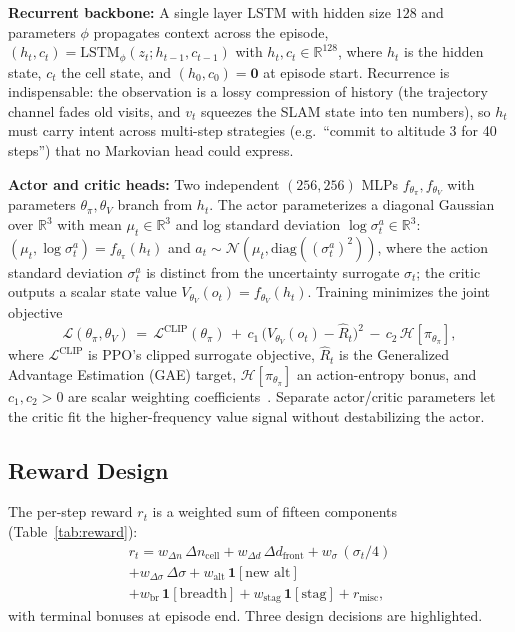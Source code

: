 \documentclass[runningheads]{llncs}
\newcommand{\ind}{\mathbf{1}}  %
\begin{document}
\textbf{Recurrent backbone:} A single layer LSTM with hidden size $128$ and parameters $\phi$ propagates context across the episode, $(h_t,c_t) = \mathrm{LSTM}_{\phi}(z_t; h_{t-1}, c_{t-1})$ with $h_t,c_t\!\in\!\mathbb{R}^{128}$, where $h_t$ is the hidden state, $c_t$ the cell state, and $(h_0,c_0)\!=\!\mathbf{0}$ at episode start. Recurrence is indispensable: the observation is a lossy compression of history (the trajectory channel fades old visits, and $v_t$ squeezes the SLAM state into ten numbers), so $h_t$ must carry intent across multi-step strategies (e.g.\ ``commit to altitude 3 for 40 steps'') that no Markovian head could express.

\textbf{Actor and critic heads:} Two independent $(256,256)$ MLPs $f_{\theta_\pi}, f_{\theta_V}$ with parameters $\theta_\pi, \theta_V$ branch from $h_t$. The actor parameterizes a diagonal Gaussian over $\mathbb{R}^3$ with mean $\mu_t\!\in\!\mathbb{R}^3$ and log standard deviation $\log\sigma^{a}_t\!\in\!\mathbb{R}^3$: $(\mu_t,\log\sigma^{a}_t) = f_{\theta_\pi}(h_t)$ and $a_t \sim \mathcal{N}(\mu_t,\mathrm{diag}((\sigma^{a}_t)^2))$, where the action standard deviation $\sigma^{a}_t$ is distinct from the uncertainty surrogate $\sigma_t$; the critic outputs a scalar state value $V_{\theta_V}(o_t)\!=\!f_{\theta_V}(h_t)$. Training minimizes the joint objective
\begin{equation}
\mathcal{L}(\theta_\pi,\theta_V) \,=\, \mathcal{L}^{\text{CLIP}}(\theta_\pi) \,+\, c_1\,\big(V_{\theta_V}(o_t)\!-\!\hat{R}_t\big)^2 \,-\, c_2\,\mathcal{H}[\pi_{\theta_\pi}],
\label{eq:ppo_loss}
\end{equation}
where $\mathcal{L}^{\text{CLIP}}$ is PPO's clipped surrogate objective, $\hat{R}_t$ is the Generalized Advantage Estimation (GAE) target, $\mathcal{H}[\pi_{\theta_\pi}]$ an action-entropy bonus, and $c_1,c_2\!>\!0$ are scalar weighting coefficients~\cite{raffin2021sb3}. Separate actor/critic parameters let the critic fit the higher-frequency value signal without destabilizing the actor.

\subsection{Reward Design}\label{sec:reward}
The per-step reward $r_t$ is a weighted sum of fifteen components (Table~\ref{tab:reward}):
\begin{multline}
    r_t = w_{\Delta n}\,\Delta n_{\text{cell}} + w_{\Delta d}\,\Delta d_{\text{front}} + w_\sigma\,(\sigma_t/4) \\
    + w_{\Delta\sigma}\,\Delta\sigma + w_{\text{alt}}\,\ind[\text{new alt}] \\
    + w_{\text{br}}\,\ind[\text{breadth}] + w_{\text{stag}}\,\ind[\text{stag}] + r_{\text{misc}},
\end{multline}
with terminal bonuses at episode end. Three design decisions are highlighted.
\end{document}
